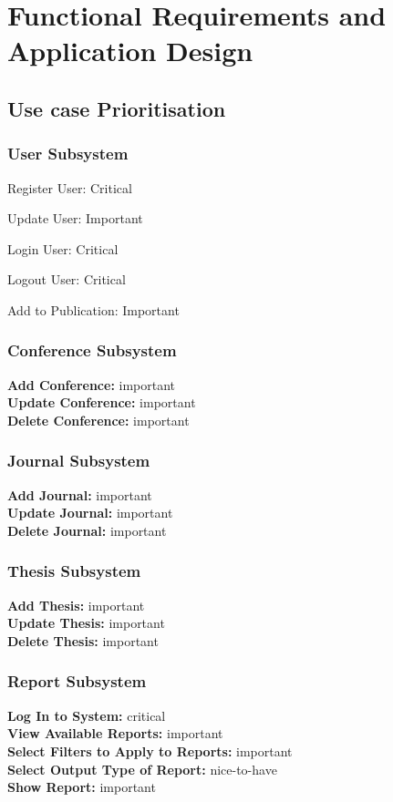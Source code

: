 \documentclass{article}
\begin{document}
	\section{Functional Requirements and Application Design}
		\subsection{Use case Prioritisation}
			\subsubsection{User Subsystem}
				Register User: Critical\par
				Update User: Important\par
				Login User: Critical\par
				Logout User: Critical\par
				Add to Publication: Important
			\subsubsection{Conference Subsystem}
				\textbf{Add Conference:} important\\
				\textbf{Update Conference:} important\\
				\textbf{Delete Conference:} important
			\subsubsection{Journal Subsystem}
				\textbf{Add Journal:} important\\
				\textbf{Update Journal:} important\\
				\textbf{Delete Journal:} important
			\subsubsection{Thesis Subsystem}
				\textbf{Add Thesis:} important\\
				\textbf{Update Thesis:} important\\
				\textbf{Delete Thesis:} important
			\subsubsection{Report Subsystem}
				\textbf{Log In to System:} critical\\
				\textbf{View Available Reports:} important\\
				\textbf{Select Filters to Apply to Reports:} important\\
				\textbf{Select Output Type of Report:} nice-to-have\\
				\textbf{Show Report:} important\\
\end{document}
